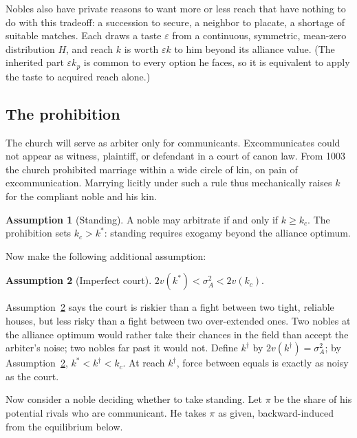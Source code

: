 \documentclass[12pt]{article}
\theoremstyle{definition}
\newtheorem{assumption}{Assumption}
\theoremstyle{remark}
\begin{document}
Nobles also have private reasons to want more or less reach that have nothing to do with this tradeoff: a succession to secure, a neighbor to placate, a shortage of suitable matches. Each draws a taste $\varepsilon$ from a continuous, symmetric, mean-zero distribution $H$, and reach $k$ is worth $\varepsilon k$ to him beyond its alliance value. (The inherited part $\varepsilon k_p$ is common to every option he faces, so it is equivalent to apply the taste to acquired reach alone.)

\subsection{The prohibition}

The church will serve as arbiter only for communicants. Excommunicates could not appear as witness, plaintiff, or defendant in a court of canon law. From 1003 the church prohibited marriage within a wide circle of kin, on pain of excommunication. Marrying licitly under such a rule thus mechanically raises $k$ for the compliant noble and his kin.

\begin{assumption}[Standing]\label{a:standing}
A noble may arbitrate if and only if $k\ge k_c$. The prohibition sets $k_c>k^\ast$: standing requires exogamy beyond the alliance optimum.
\end{assumption}

Now make the following additional assumption:
\begin{assumption}[Imperfect court]\label{a:court}
$2v(k^\ast)<\sigma^2_A<2v(k_c)$.
\end{assumption}
Assumption~\ref{a:court} says the court is riskier than a fight between two tight, reliable houses, but less risky than a fight between two over-extended ones. Two nobles at the alliance optimum would rather take their chances in the field than accept the arbiter's noise; two nobles far past it would not. Define $k^\dagger$ by $2v(k^\dagger)=\sigma^2_A$; by Assumption~\ref{a:court}, $k^\ast<k^\dagger<k_c$. At reach $k^\dagger$, force between equals is exactly as noisy as the court.

Now consider a noble deciding whether to take standing. Let $\pi$ be the share of his potential rivals who are communicant. He takes $\pi$ as given, backward-induced from the equilibrium below.
\end{document}
